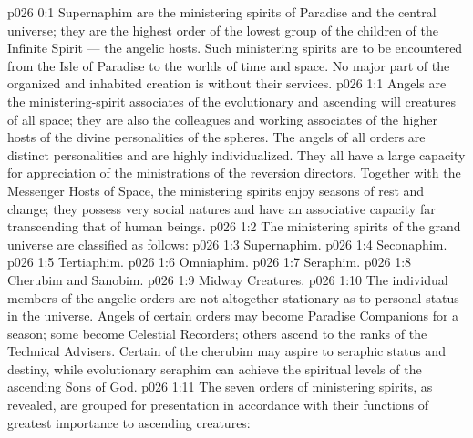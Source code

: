 \author{Perfector of Wisdom}
\vs p026 0:1 Supernaphim are the ministering spirits of Paradise and the central universe; they are the highest order of the lowest group of the children of the Infinite Spirit --- the angelic hosts. Such ministering spirits are to be encountered from the Isle of Paradise to the worlds of time and space. No major part of the organized and inhabited creation is without their services.
\vs p026 1:1 Angels are the ministering\hyp{}spirit associates of the evolutionary and ascending will creatures of all space; they are also the colleagues and working associates of the higher hosts of the divine personalities of the spheres. The angels of all orders are distinct personalities and are highly individualized. They all have a large capacity for appreciation of the ministrations of the reversion directors. Together with the Messenger Hosts of Space, the ministering spirits enjoy seasons of rest and change; they possess very social natures and have an associative capacity far transcending that of human beings.
\vs p026 1:2 \pc The ministering spirits of the grand universe are classified as follows:
\vs p026 1:3 \bibnobreakspace Supernaphim.
\vs p026 1:4 \bibnobreakspace Seconaphim.
\vs p026 1:5 \bibnobreakspace Tertiaphim.
\vs p026 1:6 \bibnobreakspace Omniaphim.
\vs p026 1:7 \bibnobreakspace Seraphim.
\vs p026 1:8 \bibnobreakspace Cherubim and Sanobim.
\vs p026 1:9 \bibnobreakspace Midway Creatures.
\vs p026 1:10 \pc The individual members of the angelic orders are not altogether stationary as to personal status in the universe. Angels of certain orders may become Paradise Companions for a season; some become Celestial Recorders; others ascend to the ranks of the Technical Advisers. Certain of the cherubim may aspire to seraphic status and destiny, while evolutionary seraphim can achieve the spiritual levels of the ascending Sons of God.
\vs p026 1:11 \pc The seven orders of ministering spirits, as revealed, are grouped for presentation in accordance with their functions of greatest importance to ascending creatures:
